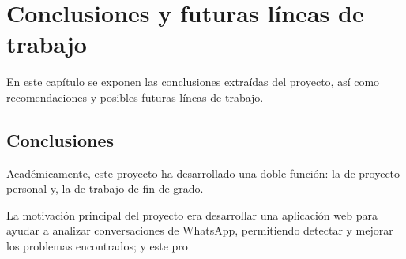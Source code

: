 \chapter{Conclusiones y futuras líneas de trabajo}
\label{chap:conclusions}

En este capítulo se exponen las conclusiones extraídas del proyecto, así como recomendaciones y posibles futuras líneas de trabajo.

\section{Conclusiones}
\label{sec:conclusions}

Académicamente, este proyecto ha desarrollado una doble función: la de proyecto personal y, la de trabajo de fin de grado.

La motivación principal del proyecto era desarrollar una aplicación web para ayudar a analizar conversaciones de WhatsApp, permitiendo detectar y mejorar los problemas encontrados; y este pro

